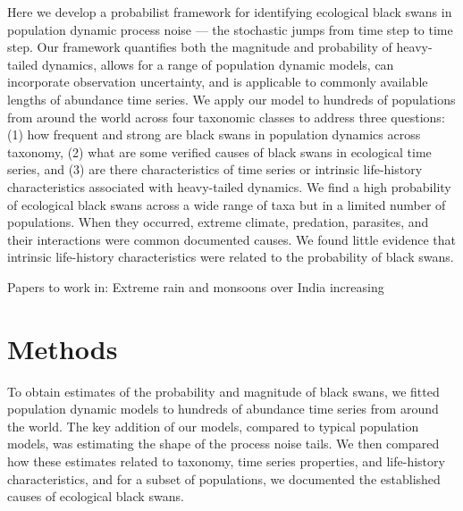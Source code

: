 Here we develop a probabilist framework for identifying ecological black swans in population dynamic process noise --- the stochastic jumps from time step to time step. Our framework quantifies both the magnitude and probability of heavy-tailed dynamics, allows for a range of population dynamic models, can incorporate observation uncertainty, and is applicable to commonly available lengths of abundance time series. We apply our model to hundreds of populations from around the world across four taxonomic classes to address three questions: (1) how frequent and strong are black swans in population dynamics across taxonomy, (2) what are some verified causes of black swans in ecological time series, and (3) are there characteristics of time series or intrinsic life-history characteristics associated with heavy-tailed dynamics. We find a high probability of ecological black swans across a wide range of taxa but in a limited number of populations. When they occurred, extreme climate, predation, parasites, and their interactions were common documented causes. We found little evidence that intrinsic life-history characteristics were related to the probability of black swans.

Papers to work in: \citep{inchausti2002, halley2002, inchausti2001} \citep{jentsch2007} \citep{ward2007} \citep{garcia-carreras2011} \citep{sornette2009} \citep{nunez2012} \citep{thompson2013} \citep{beaugrand2012} \citep{pine-iii2009} \citep{doak2008} Extreme rain and monsoons over India increasing \citep{goswami2006} \citep{smale2013} \citep{easterling2000} \citep{scheffer2003} \citep{katz2005} \citep{taleb2007} \citep{vasseur2014} \citep{vert-pre2013} \citep{lindenmayer2010} \citep{valpine2002} \citep{gregory2010} \citet{garcia-carreras2011} \citeauthor{brook2006} \citetext{\citeyear{brook2006}; \citealp{herrandoprez2014}} \citep{sibly2005, ziebarth2010}

\section{Methods}

To obtain estimates of the probability and magnitude of black swans, we fitted population dynamic models to hundreds of abundance time series from around the world. The key addition of our models, compared to typical population models, was estimating the shape of the process noise tails. We then compared how these estimates related to taxonomy, time series properties, and life-history characteristics, and for a subset of populations, we documented the established causes of ecological black swans.

